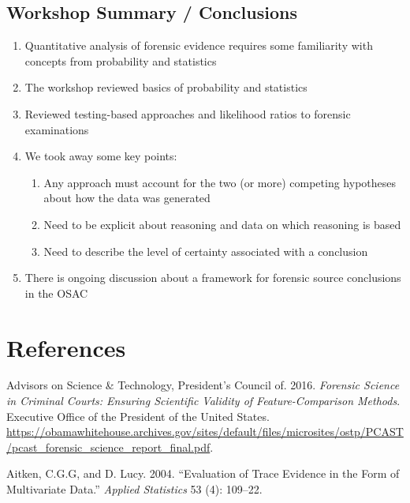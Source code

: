 \documentclass[]{book}
\providecommand{\tightlist}{%
  \setlength{\itemsep}{0pt}\setlength{\parskip}{0pt}}
\theoremstyle{definition}
\theoremstyle{definition}
\theoremstyle{remark}
\begin{document}
\section{Workshop Summary /
Conclusions}\label{workshop-summary-conclusions}

\begin{enumerate}
\def\labelenumi{\arabic{enumi}.}
\tightlist
\item
  Quantitative analysis of forensic evidence requires some familiarity
  with concepts from probability and statistics
\item
  The workshop reviewed basics of probability and statistics
\item
  Reviewed testing-based approaches and likelihood ratios to forensic
  examinations
\item
  We took away some key points:

  \begin{enumerate}
  \def\labelenumii{\alph{enumii}.}
  \tightlist
  \item
    Any approach must account for the two (or more) competing hypotheses
    about how the data was generated
  \item
    Need to be explicit about reasoning and data on which reasoning is
    based
  \item
    Need to describe the level of certainty associated with a conclusion
  \end{enumerate}
\item
  There is ongoing discussion about a framework for forensic source
  conclusions in the OSAC
\end{enumerate}

\chapter*{References}\label{references}

\hypertarget{refs}{}
\hypertarget{ref-pcast}{}
Advisors on Science \& Technology, President's Council of. 2016.
\emph{Forensic Science in Criminal Courts: Ensuring Scientific Validity
of Feature-Comparison Methods}. Executive Office of the President of the
United States.
\url{https://obamawhitehouse.archives.gov/sites/default/files/microsites/ostp/PCAST/pcast_forensic_science_report_final.pdf}.

\hypertarget{ref-aitkenlucy}{}
Aitken, C.G.G, and D. Lucy. 2004. ``Evaluation of Trace Evidence in the
Form of Multivariate Data.'' \emph{Applied Statistics} 53 (4): 109--22.
\end{document}
